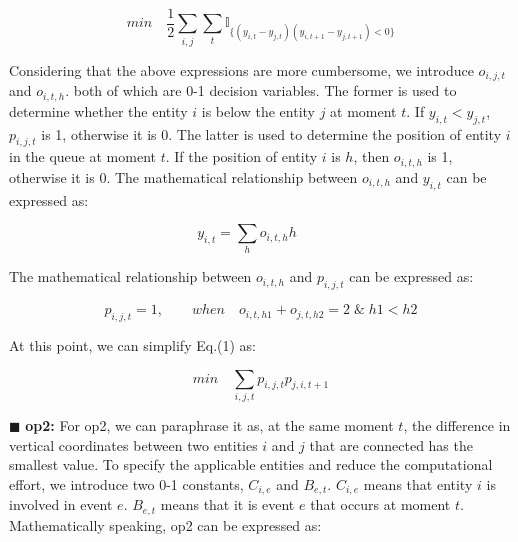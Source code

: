 \begin{equation}
	min \quad  \frac{1}{2}\sum_{i,j}\sum_{t}\mathbb{I}_{\{(y_{i,t}-y_{j,t})(y_{i,t+1}-y_{j,t+1})<0 \}}
\end{equation}

Considering that the above expressions are more cumbersome, we introduce $o_{i,j,t}$ and $o_{i,t,h}$. both of which are 0-1 decision variables. The former is used to determine whether the entity $i$ is below the entity $j$ at moment $t$. If $y_{i,t}<y_{j,t}$, $p_{i,j,t}$ is 1, otherwise it is 0. The latter is used to determine the position of entity $i$ in the queue at moment $t$. If the position of entity $i$ is $h$, then $o_{i,t,h}$ is 1, otherwise it is 0. The mathematical relationship between $o_{i,t,h}$ and $y_{i,t}$ can be expressed as:

\begin{equation}
y_{i,t} =  \sum_{h}o_{i,t,h}h \quad\quad 
\end{equation}


\noindent The mathematical relationship between $o_{i,t,h}$ and $p_{i,j,t}$ can be expressed as:

\begin{equation}
p_{i,j,t} = 1, \quad\quad when\quad o_{i,t,h1} + o_{j,t,h2}=2\;\&\;h1<h2
\end{equation}

\noindent At this point, we can simplify Eq.(1) as:

\begin{equation}
	min \quad \sum_{i,j,t}p_{i,j,t}p_{j,i,t+1}
\end{equation}

$\blacksquare$ \textbf{op2:} For op2, we can paraphrase it as, at the same moment $t$, the difference in vertical coordinates between two entities $i$ and $j$ that are connected has the smallest value. To specify the applicable entities and reduce the computational effort, we introduce two 0-1 constants, $C_{i,e}$ and $B_{e,t}$. $C_{i,e}$ means that entity $i$ is involved in event $e$. $B_{e,t}$ means that it is event $e$ that occurs at moment $t$. Mathematically speaking, op2 can be expressed as:

